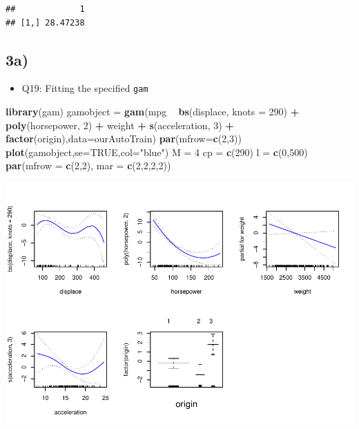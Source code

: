 \documentclass[]{article}
\newenvironment{Shaded}{\begin{snugshade}}{\end{snugshade}}
\newcommand{\KeywordTok}[1]{\textcolor[rgb]{0.13,0.29,0.53}{\textbf{#1}}}
\newcommand{\DataTypeTok}[1]{\textcolor[rgb]{0.13,0.29,0.53}{#1}}
\newcommand{\DecValTok}[1]{\textcolor[rgb]{0.00,0.00,0.81}{#1}}
\newcommand{\StringTok}[1]{\textcolor[rgb]{0.31,0.60,0.02}{#1}}
\newcommand{\OtherTok}[1]{\textcolor[rgb]{0.56,0.35,0.01}{#1}}
\newcommand{\OperatorTok}[1]{\textcolor[rgb]{0.81,0.36,0.00}{\textbf{#1}}}
\newcommand{\NormalTok}[1]{#1}
\providecommand{\tightlist}{%
  \setlength{\itemsep}{0pt}\setlength{\parskip}{0pt}}
\begin{document}
\begin{verbatim}
##             1
## [1,] 28.47238
\end{verbatim}

\subsection{3a)}\label{a-1}

\begin{itemize}
\tightlist
\item
  Q19: Fitting the specified \texttt{gam}
\end{itemize}

\begin{Shaded}
\begin{Highlighting}[]
\KeywordTok{library}\NormalTok{(gam)}
\NormalTok{gamobject =}\StringTok{ }\KeywordTok{gam}\NormalTok{(mpg }\OperatorTok{~}\StringTok{ }\KeywordTok{bs}\NormalTok{(displace, }\DataTypeTok{knots  =} \DecValTok{290}\NormalTok{) }\OperatorTok{+}\StringTok{ }\KeywordTok{poly}\NormalTok{(horsepower, }\DecValTok{2}\NormalTok{)  }\OperatorTok{+}\StringTok{ }\NormalTok{weight }\OperatorTok{+}\StringTok{ }\KeywordTok{s}\NormalTok{(acceleration, }\DecValTok{3}\NormalTok{) }\OperatorTok{+}\StringTok{ }\KeywordTok{factor}\NormalTok{(origin),}\DataTypeTok{data=}\NormalTok{ourAutoTrain)}
\KeywordTok{par}\NormalTok{(}\DataTypeTok{mfrow=}\KeywordTok{c}\NormalTok{(}\DecValTok{2}\NormalTok{,}\DecValTok{3}\NormalTok{))}
\KeywordTok{plot}\NormalTok{(gamobject,}\DataTypeTok{se=}\OtherTok{TRUE}\NormalTok{,}\DataTypeTok{col=}\StringTok{"blue"}\NormalTok{)}
\NormalTok{M =}\StringTok{ }\DecValTok{4}
\NormalTok{cp =}\StringTok{ }\KeywordTok{c}\NormalTok{(}\DecValTok{290}\NormalTok{)}
\NormalTok{l =}\StringTok{ }\KeywordTok{c}\NormalTok{(}\DecValTok{0}\NormalTok{,}\DecValTok{500}\NormalTok{)}
\KeywordTok{par}\NormalTok{(}\DataTypeTok{mfrow =} \KeywordTok{c}\NormalTok{(}\DecValTok{2}\NormalTok{,}\DecValTok{2}\NormalTok{), }\DataTypeTok{mar =} \KeywordTok{c}\NormalTok{(}\DecValTok{2}\NormalTok{,}\DecValTok{2}\NormalTok{,}\DecValTok{2}\NormalTok{,}\DecValTok{2}\NormalTok{))}
\end{Highlighting}
\end{Shaded}

\includegraphics{Project2_files/figure-latex/unnamed-chunk-9-1.pdf}
\end{document}
